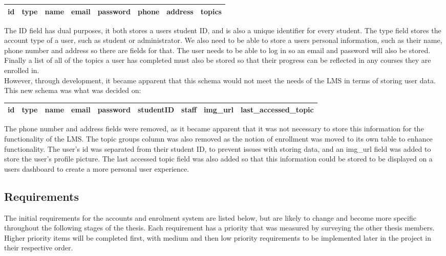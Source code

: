 \begin{center}
    \begin{tabular}{|c|c|c|c|c|c|c|c|} 
        \hline
        id & type & name & email & password & phone & address & topics \\ [0.5ex] 
        \hline
    \end{tabular}
\end{center}

The ID field has dual purposes, it both stores a users student ID, and is also a unique identifier for every student. The type field stores the account type of a user, such as student or administrator. We also need to be able to store a users personal information, such as their name, phone number and address so there are fields for that. The user needs to be able to log in so an email and password will also be stored. Finally a list of all of the topics a user has completed must also be stored so that their progress can be reflected in any courses they are enrolled in.\\

However, through development, it became apparent that this schema would not meet the needs of the LMS in terms of storing user data. This new schema was what was decided on:

\begin{center}
    \begin{tabular}{|c|c|c|c|c|c|c|c|c|} 
        \hline
        id & type & name & email & password & studentID & staff & img\_url & last\_accessed\_topic \\ [0.5ex] 
        \hline
    \end{tabular}
\end{center}
The phone number and address fields were removed, as it became apparent that it was not necessary to store this information for the functionality of the LMS. The topic groups column was also removed as the notion of enrollment was moved to its own table to enhance functionality. The user's id was separated from their student ID, to prevent issues with storing data, and an img\_url field was added to store the user's profile picture. The last accessed topic field was also added so that this information could be stored to be displayed on a users dashboard to create a more personal user experience. 

\subsection{Requirements}
The initial requirements for the accounts and enrolment system are listed below, but are likely to change and become more specific throughout the following stages of the thesis. Each requirement has a priority that was measured by surveying the other thesis members. Higher priority items will be completed first, with medium and then low priority requirements to be implemented later in the project in their respective order.

